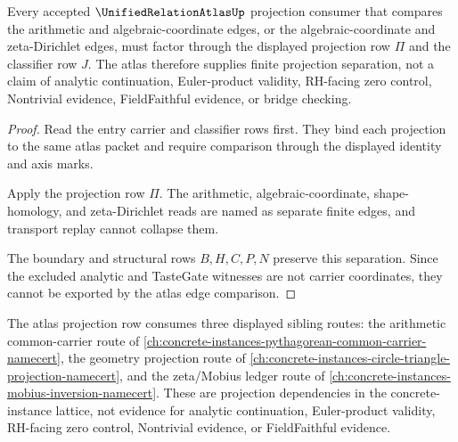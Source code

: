 \begin{theorem}
\label{thm:unified-relation-atlas-edge-separation}
Every accepted $\UnifiedRelationAtlasUp$ projection consumer that compares the arithmetic and algebraic-coordinate edges, or the algebraic-coordinate and zeta-Dirichlet edges, must factor through the displayed projection row $\Pi$ and the classifier row $J$. The atlas therefore supplies finite projection separation, not a claim of analytic continuation, Euler-product validity, RH-facing zero control, Nontrivial evidence, FieldFaithful evidence, or bridge checking.
\end{theorem}
\begin{proof}
Read the entry carrier and classifier rows first. They bind each projection to the same atlas packet and require comparison through the displayed identity and axis marks.

Apply the projection row $\Pi$. The arithmetic, algebraic-coordinate, shape-homology, and zeta-Dirichlet reads are named as separate finite edges, and transport replay cannot collapse them.

The boundary and structural rows $B,H,C,P,N$ preserve this separation. Since the excluded analytic and TasteGate witnesses are not carrier coordinates, they cannot be exported by the atlas edge comparison.
\end{proof}



The atlas projection row consumes three displayed sibling routes: the arithmetic common-carrier route of \autoref{ch:concrete-instances-pythagorean-common-carrier-namecert}, the geometry projection route of \autoref{ch:concrete-instances-circle-triangle-projection-namecert}, and the zeta/Mobius ledger route of \autoref{ch:concrete-instances-mobius-inversion-namecert}. These are projection dependencies in the concrete-instance lattice, not evidence for analytic continuation, Euler-product validity, RH-facing zero control, Nontrivial evidence, or FieldFaithful evidence.

